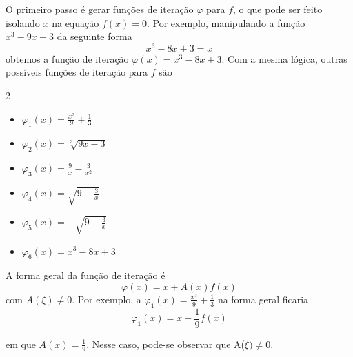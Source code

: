 O primeiro passo é gerar funções de iteração $\varphi$ para $f$, o que pode ser feito isolando $x$ na equação $f(x) = 0$. Por exemplo, manipulando a função $x^3 -9x + 3$  da seguinte forma
\begin{equation*}
    x^3 - 8x + 3 = x 
\end{equation*} 
obtemos a função de iteração $\varphi(x) = x^3 - 8x + 3$. Com a mesma lógica, outras possíveis funções de iteração para $f$ são

\begin{multicols}{2}
\begin{itemize} %
    \item[a)] $\varphi_1(x) = \frac{x^3}{9} + \frac{1}{3}$
    \item[b)] $\varphi_2(x) = \sqrt[3]{9x-3}$
    \item[c)] $\varphi_3(x) = \frac{9}{x} - \frac{3}{x^2}$
    \item[d)] $\varphi_4(x) = \sqrt{9 - \frac{3}{x}}$
    \item[e)] $\varphi_5(x) = -\sqrt{9 - \frac{3}{x}}$
    \item[f)] $\varphi_6(x) = x^3 - 8x + 3$
\end{itemize}
\end{multicols}
A forma geral da função de iteração é 
\begin{equation}
    \varphi(x) = x + A(x)f(x) \label{it}
\end{equation}
com $A(\xi) \ne 0$.
Por exemplo, a $\varphi_1(x) = \frac{x^3}{9} + \frac{1}{3}$ na forma geral ficaria 
\begin{equation*}
    \varphi_1(x) = x + \frac{1}{9}f(x)
\end{equation*}

em que $A(x) = \frac{1}{9}$. Nesse caso, pode-se observar que A($\xi) \neq 0$.


